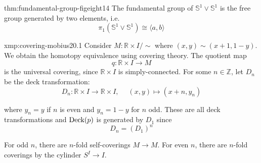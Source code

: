 \documentclass[landscape, 8pt]{extarticle}
\begin{document}
\begin{multicols*}{3}
\vspace{-7pt}
\begin{thm}{thm:fundamental-group-figeight}{14}
	\vspace{-2pt}
	The fundamental group of $\mathbb{S}^{1} \vee \mathbb{S}^{1}$ is the free group generated by two elements, i.e.
	\vspace{-4pt}
	\[\pi_{1}(\mathbb{S}^{1} \vee \mathbb{S}^{1}) \cong \langle a, b \rangle\]
\end{thm}

\vspace{-7pt}
\begin{xmp}{xmp:covering-mobius}{20.1}
	\vspace{-2pt}
	Consider $M : \mathbb{R} \times I / \sim$ where $(x, y) \sim (x + 1, 1 - y)$. We obtain the homotopy equivalence using covering theory. The quotient map
	\[q : \mathbb{R} \times I \to M\]
	is the universal covering, since $\mathbb{R} \times I$ is simply-connected. For some $n\in \mathbb{Z}$, let $D_{n}$ be the deck transformation:
	\vspace{-1pt}
	\[D_{n} : \mathbb{R} \times I \to \mathbb{R} \times I,\;\quad (x, y) \mapsto (x+n, y_{n})\]
	\par\vspace{-3pt}
	where $y_{n} = y$ if $n$ is even and $y_{n} = 1-y$ for $n$ odd. These are all deck transformations and $\operatorname{Deck}(p)$ is generated by $D_{1}$ since
	\vspace{-1pt}
	\[D_{n} = (D_{1})^{n}\]
	\par\vspace{-3pt}
	\tcbline
	For odd $n$, there are $n$-fold self-coverings $M \to M$. For even $n$, there are $n$-fold coverings by the cylinder $S^{I} \to I$.
\end{xmp}


\end{multicols*}
\end{document}
